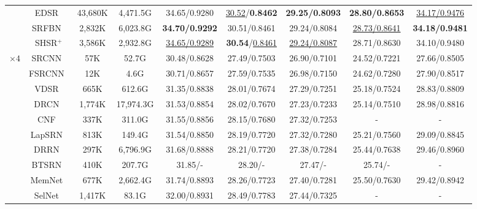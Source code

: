 \documentclass[manuscript,screen]{acmart}
\begin{document}
\begin{table*}[t]
\begin{tabular}{|c|c|c|c|c|c|c|c|c|}
		\cline{2-9}
		
		&EDSR~\cite{edsr_cvpr2017}&43,680K& 4,471.5G& 34.65/0.9280& \underline{30.52}/\textbf{0.8462}& \textbf{29.25/0.8093}& \textbf{28.80/0.8653}& \underline{34.17/0.9476}\\
		
		&SRFBN~\cite{srfbn_cvpr2019}&2,832K& 6,023.8G& \textbf{34.70/0.9292}& 30.51/0.8461& 29.24/0.8084& \underline{28.73/0.8641}& \textbf{34.18/0.9481}\\
		


		&SHSR$^+$&3,586K& 2,932.8G&\underline{34.65/0.9289}& \textbf{30.54}/\underline{0.8461}& \underline{29.24/0.8087}& 28.71/0.8630& 34.10/0.9480 \\
\hline
		\hline
		\multirow{18}{*}{$\times4$}&SRCNN~\cite{srcnn_pami2016}&57K &52.7G & 
		30.48/0.8628& 27.49/0.7503& 26.90/0.7101& 24.52/0.7221& 27.66/0.8505\\
		
		&FSRCNN~\cite{fsrcnn_eccv2016}&12K&4.6G& 
		30.71/0.8657& 27.59/0.7535& 26.98/0.7150& 24.62/0.7280& 27.90/0.8517\\
		
		&VDSR~\cite{vdsr_cvpr2016}&665K&612.6G& 
		31.35/0.8838& 28.01/0.7674& 27.29/0.7251& 25.18/0.7524& 28.83/0.8809\\
		
		&DRCN~\cite{drcn_cvpr2016}&1,774K&17,974.3G& 
		31.53/0.8854& 28.02/0.7670& 27.23/0.7233& 25.14/0.7510& 28.98/0.8816\\
		
		&CNF~\cite{cnf_cvprw2017}&337K&311.0G& 
		31.55/0.8856& 28.15/0.7680& 27.32/0.7253& - & - \\
		
		&LapSRN~\cite{lapsrn_cvpr2017}&813K&149.4G& 
		31.54/0.8850& 28.19/0.7720& 27.32/0.7280& 25.21/0.7560& 29.09/0.8845\\
		
		&DRRN~\cite{drrn_cvpr2017}&297K&6,796.9G& 
		31.68/0.8888& 28.21/0.7720& 27.38/0.7284& 25.44/0.7638& 29.46/0.8960\\
		
		&BTSRN~\cite{btsrn_cvprw2017}&410K&207.7G& 
		31.85/-& 28.20/-& 27.47/-& 25.74/-& -\\
		
		&MemNet~\cite{memnet_iccv2017}&677K&2,662.4G& 
		31.74/0.8893& 28.26/0.7723& 27.40/0.7281& 25.50/0.7630& 29.42/0.8942 \\
		
		&SelNet~\cite{selnet_cvprw2017}&1,417K&83.1G& 
		32.00/0.8931& 28.49/0.7783& 27.44/0.7325& - &  - \\
		

\end{tabular}
\end{table*}
\end{document}
